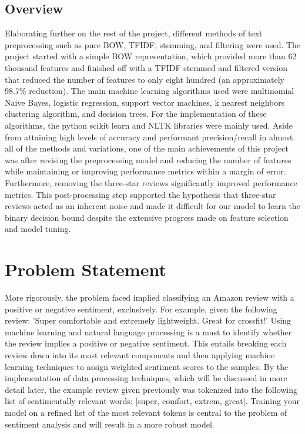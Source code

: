 \documentclass[conference , 11pt]{IEEEtran}
\begin{document}
\subsection{Overview}
Elaborating further on the rest of the project, different methods of text preprocessing such as pure BOW, TFIDF, stemming, and filtering were used. The project started with a simple BOW representation, which provided more than 62 thousand features and finished off with a TFIDF stemmed and filtered version that reduced the number of features to only eight hundred (an approximately 98.7\% reduction). The main machine learning algorithms used were multinomial Naive Bayes, logistic regression, support vector machines, k nearest neighbors clustering algorithm, and decision trees. For the implementation of these algorithms, the python scikit learn and NLTK libraries were mainly used. Aside from attaining high levels of accuracy and performant precision/recall in almost all of the methods and variations, one of the main achievements of this project was after revising the preprocessing model and reducing the number of features while maintaining or improving performance metrics within a margin of error. Furthermore, removing the three-star reviews significantly improved performance metrics. This post-processing step supported the hypothesis that three-star reviews acted as an inherent noise and made it difficult for our model to learn the binary decision bound despite the extensive progress made on feature selection and model tuning.


\section{Problem Statement}

More rigorously, the problem faced implied classifying an Amazon review with a positive or negative sentiment, exclusively. For example, given the following review: ’Super comfortable and extremely lightweight. Great for crossfit!’ Using machine learning and natural language processing is a must to identify whether the review implies a positive or negative sentiment. This entails breaking each review down into its most relevant components and then applying machine learning techniques to assign weighted sentiment scores to the samples. By the implementation of data processing techniques, which will be discussed in more detail later, the example review given previously was tokenized into the following list of sentimentally relevant words: [super, comfort, extrem, great]. Training your model on a refined list of the most relevant tokens is central to the problem of sentiment analysis and will result in a more robust model.
	
\end{document}
